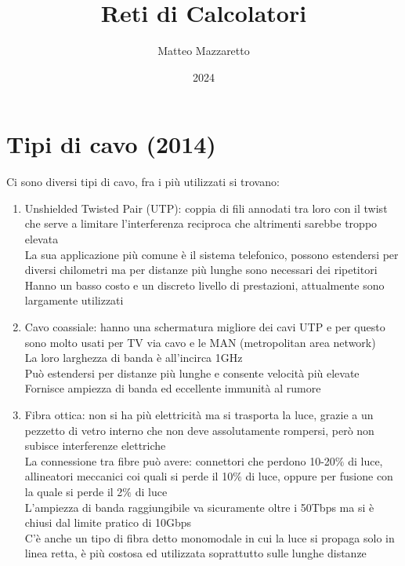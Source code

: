\documentclass[10pt,oneside,a4paper]{article}
\title{Reti di Calcolatori}
\author{Matteo Mazzaretto}
\date{2024}
\begin{document}
\maketitle
\begin{center}
\renewcommand{\contentsname}{Indice}
\tableofcontents
\end{center}
\newpage
\setcounter{page}{1}
\section{Tipi di cavo (2014)}
Ci sono diversi tipi di cavo, fra i più utilizzati si trovano:\\
\begin{enumerate}
\item Unshielded Twisted Pair (UTP): coppia di fili annodati tra loro con il twist che serve a limitare l'interferenza reciproca che altrimenti sarebbe troppo elevata\\
La sua applicazione più comune è il sistema telefonico, possono estendersi per diversi chilometri ma per distanze più lunghe sono necessari dei ripetitori\\
Hanno un basso costo e un discreto livello di prestazioni, attualmente sono largamente utilizzati
\item Cavo coassiale: hanno una schermatura migliore dei cavi UTP e per questo sono molto usati per TV via cavo e le MAN (metropolitan area network)\\
La loro larghezza di banda è all'incirca 1GHz\\
Può estendersi per distanze più lunghe e consente velocità più elevate\\
Fornisce ampiezza di banda ed eccellente immunità al rumore
\item Fibra ottica: non si ha più elettricità ma si trasporta la luce, grazie a un pezzetto di vetro interno che non deve assolutamente rompersi, però non subisce interferenze elettriche\\
La connessione tra fibre può avere: connettori che perdono 10-20$\%$ di luce, allineatori meccanici coi quali si perde il 10$\%$ di luce, oppure per fusione con la quale si perde il 2$\%$ di luce\\
L'ampiezza di banda raggiungibile va sicuramente oltre i 50Tbps ma si è chiusi dal limite pratico di 10Gbps\\
C'è anche un tipo di fibra detto monomodale in cui la luce si propaga solo in linea retta, è più costosa ed utilizzata soprattutto sulle lunghe distanze
\end{enumerate}
\end{document}
